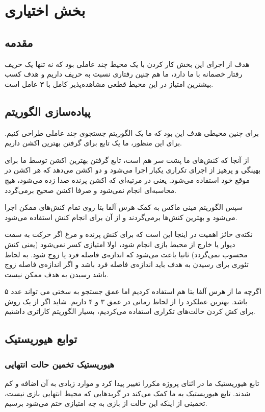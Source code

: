\documentclass[11pt, a4paper, oneside]{article}
\begin{document}
	
	
	\section{بخش اختیاری}
	
	\subsection{مقدمه}
	هدف از اجرای این بخش کار کردن با یک محیط چند عاملی بود که نه تنها یک حریف رفتار خصمانه با ما دارد، ما هم چنین رفتاری نسبت به حریف داریم و هدف کسب بیشترین امتیاز در این محیط قطعی مشاهده‌پذیر کامل با ۳ عامل است.
	
	\subsection{پیاده‌سازی الگوریتم}
	برای چنین محیطی هدف این بود که ما یک الگوریتم جستجوی چند عاملی طراحی کنیم. برای این منظور، ما  یک تابع برای گرفتن بهترین اکشن داریم.
	
	از آنجا که کنش‌های ما پشت سر هم است، تابع گرفتن بهترین اکشن توسط ما برای بهینگی و پرهیز از اجرای تکراری یکبار اجرا می‌شود و دو اکشن می‌دهد که هر اکشن در موقع خود استفاده می‌شود. یعنی در مرتبه‌ای که اکشن پرنده صدا زده می‌شود، هیچ محاسبه‌ای انجام نمی‌شود و صرفا اکشن صحیح برمی‌گردد.
	
	سپس الگوریتم مینی ماکس به کمک هرس آلفا بتا روی تمام کنش‌های ممکن اجرا می‌شود و بهترین کنش‌ها برمی‌گردند و از آن برای انجام کنش استفاده می‌شود. 

نکته‌ی حائز اهمیت در اینجا این است که برای کنش پرنده و مرغ اگر حرکت به سمت دیوار یا خارج از محیط بازی انجام شود، اولا امتیازی کسر نمی‌شود (یعنی کنش محسوب نمی‌گردد) ثانیا باعث می‌شود که اندازه‌ی فاصله فرد یا زوج شود. به لحاظ تئوری برای رسیدن به هدف باید اندازه‌ی فاصله فرد باشد و اگر اندازه‌ی فاصله زوج باشد رسیدن به هدف ممکن نیست.

اگرچه ما از هرس آلفا بتا هم استفاده کردیم اما عمق جستجو به سختی می تواند عدد ۵ باشد. بهترین عملکرد را از لحاظ زمانی در عمق ۳ و ۴ داریم. شاید اگر از یک روش برای کش کردن حالت‌های تکراری استفاده می‌کردیم، بسیار الگوریتم کاراتری داشتیم.

\subsection{توابع هیوریستیک}
\subsubsection{هیوریستیک تخمین حالت انتهایی}
تابع هیوریستیک ما در اثنای پروژه مکررا تغییر پیدا کرد و موارد زیادی به آن اضافه و کم شدند. تابع هیوریستیک به ما کمک می‌کند در گریدهایی که محیط انتهایی بازی نیست، تخمینی از اینکه این حالت از بازی به چه امتیازی ختم می‌شود برسیم. 
\end{document}
